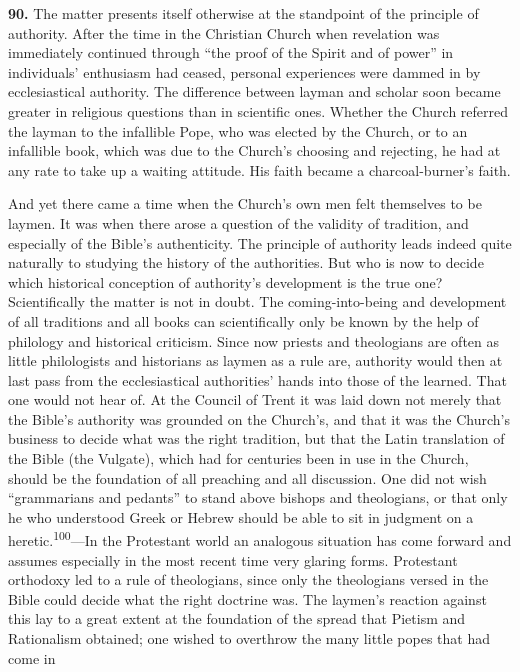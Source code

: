 \documentclass[12pt,a4paper]{book}
\newcommand{\opage}[1]{\marginnote{\footnotesize\textit{[#1]}}}
\begin{document}
\medskip

\noindent\textbf{90.} The matter presents itself otherwise at the standpoint of the principle of authority.
After the time in the Christian Church when revelation was immediately continued through ``the proof of the
Spirit and of power'' in individuals' enthusiasm had ceased, personal experiences were dammed in by
ecclesiastical authority. The difference between layman and scholar soon became greater in religious
questions than in 
\opage{206}scientific ones. Whether the Church referred the layman to the infallible Pope, who was
elected by the Church, or to an infallible book, which was due to the Church's choosing and rejecting, he had
at any rate to take up a waiting attitude. His faith became a charcoal-burner's faith.

And yet there came a time when the Church's own men felt themselves to be laymen. It was when there arose a
question of the validity of tradition, and especially of the Bible's authenticity. The principle of authority
leads indeed quite naturally to studying the history of the authorities. But who is now to decide which
historical conception of authority's development is the true one? Scientifically the matter is not in doubt.
The coming-into-being and development of all traditions and all books can scientifically only be known by the
help of philology and historical criticism. Since now priests and theologians are often as little philologists
and historians as laymen as a rule are, authority would then at last pass from the ecclesiastical authorities'
hands into those of the learned. That one would not hear of. At the Council of Trent it was laid down not
merely that the Bible's authority was grounded on the Church's, and that it was the Church's business to decide
what was the right tradition, but that the Latin translation of the Bible (the Vulgate), which had for centuries
been in use in the Church, should be the foundation of all preaching and all discussion. One did not wish
``grammarians and pedants'' to stand above bishops and theologians, or that only he who understood Greek or
Hebrew should be able to sit in judgment on a heretic.\textsuperscript{100}---In the Protestant world an
analogous situation has come forward and assumes especially in the most recent time very glaring forms.
Protestant orthodoxy led to a rule of theologians, since only the theologians versed in the Bible could decide
what the right doctrine was. The laymen's reaction against this lay to a great extent at the foundation of the
spread that Pietism and Rationalism obtained; one wished to overthrow the many little popes that had come in
\end{document}
